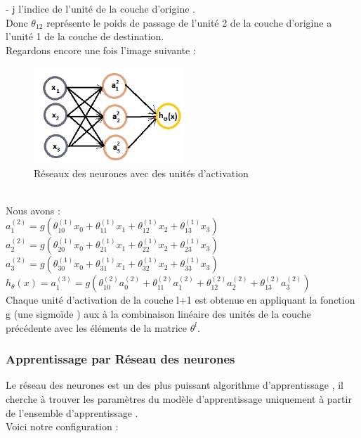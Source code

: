  - j l'indice de l'unité de la couche d'origine .\\
  Donc ${\theta}_{12}$ représente le poids de passage de l'unité 2 de la couche d'origine a l'unité 1 de la couche de destination.\\
 Regardons encore une fois l'image suivante :
\begin{figure}[ht]
 	\centering
 	\includegraphics[width=0.5\textwidth]{fig/NeuralNtwork2.png}
 	\caption{Réseaux des neurones avec des unités d'activation }
 	\label{fig:image12}
\end{figure}\\
 Nous avons : \\
 ${a}_{1}^{(2) }= g({\theta}_{10}^{(1)}{x}_{0} + {\theta}_{11}^{(1)}{x}_{1} + {\theta}_{12}^{(1)}{x}_{2} + {\theta}_{13}^{(1)}{x}_{3})$ \\
 ${a}_{2}^{(2) }= g({\theta}_{20}^{(1)}{x}_{0} + {\theta}_{21}^{(1)}{x}_{1} + {\theta}_{22}^{(1)}{x}_{2} + {\theta}_{23}^{(1)}{x}_{3})$ \\
 ${a}_{3}^{(2) }= g({\theta}_{30}^{(1)}{x}_{0} + {\theta}_{31}^{(1)}{x}_{1} + {\theta}_{32}^{(1)}{x}_{2} + {\theta}_{33}^{(1)}{x}_{3})$ \\
 ${h}_{\theta}(x) ={a}_{1}^{(3) }= g({\theta}_{10}^{(2)}{a}_{0}^{(2)} + {\theta}_{11}^{(2)}{a}_{1}^{(2)} + {\theta}_{12}^{(2)}{a}_{2}^{(2)} + {\theta}_{13}^{(2)}{a}_{3}^{(2)})$ \\
 
 Chaque unité d'activation de la couche l+1 est obtenue en appliquant la fonction g (une sigmoïde ) aux à la combinaison linéaire des unités de la couche précédente avec les éléments de la matrice ${\theta}^{l}$. \\
 \subsubsection{Apprentissage par Réseau des neurones }
 Le réseau des neurones est un des plus puissant algorithme d'apprentissage ,
 il cherche à trouver les paramètres du modèle d'apprentissage uniquement à partir de l'ensemble d'apprentissage .\\
 Voici notre configuration :
 
